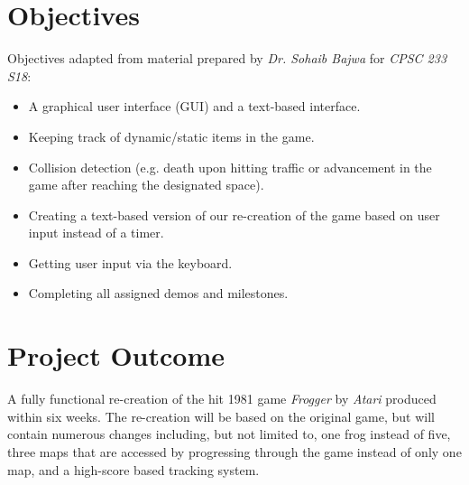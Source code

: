 \documentclass{article}
\begin{document}
\section{Objectives}
Objectives adapted from material prepared by \textit{Dr. Sohaib Bajwa} for \textit{CPSC 233 S18}:
\begin{itemize}
    \item A graphical user interface (GUI) and a text-based interface.
    \item Keeping track of dynamic/static items in the game.
    \item Collision detection (e.g. death upon hitting traffic or advancement in the game after reaching the designated space).
    \item Creating a text-based version of our re-creation of the game based on user input instead of a timer.
    \item Getting user input via the keyboard.
    \item Completing all assigned demos and milestones.
\end{itemize}

\section{Project Outcome}
A fully functional re-creation of the hit 1981 game \textit{Frogger} by \textit{Atari} produced within six weeks. The re-creation will be based on the original game, but will contain numerous changes including, but not limited to, one frog instead of five, three maps that are accessed by progressing through the game instead of only one map, and a high-score based tracking system.
\end{document}
